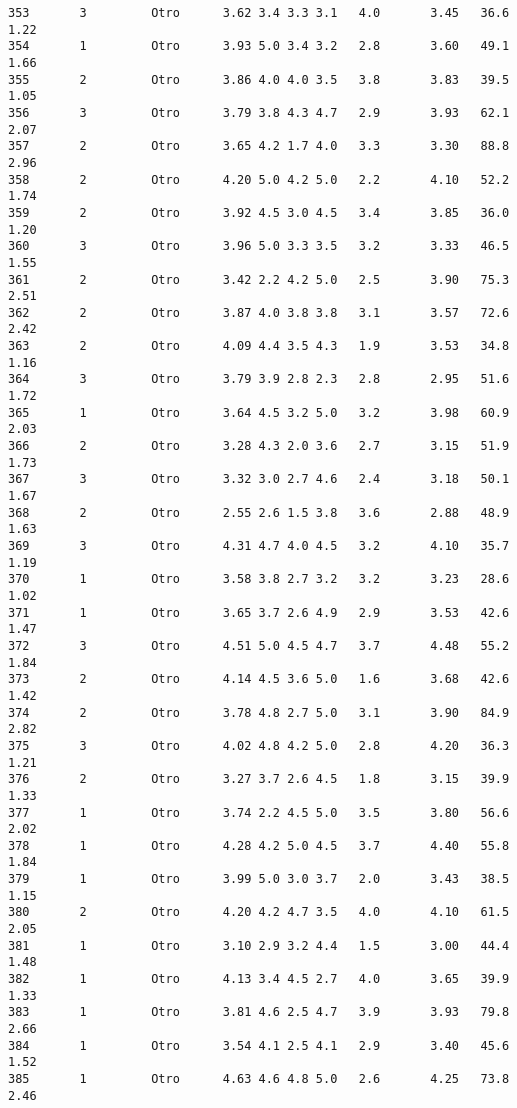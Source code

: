 \documentclass[
  letterpaper,
  DIV=11,
  numbers=noendperiod]{scrartcl}
\begin{document}
\begin{verbatim}
353       3         Otro      3.62 3.4 3.3 3.1   4.0       3.45   36.6    1.22
354       1         Otro      3.93 5.0 3.4 3.2   2.8       3.60   49.1    1.66
355       2         Otro      3.86 4.0 4.0 3.5   3.8       3.83   39.5    1.05
356       3         Otro      3.79 3.8 4.3 4.7   2.9       3.93   62.1    2.07
357       2         Otro      3.65 4.2 1.7 4.0   3.3       3.30   88.8    2.96
358       2         Otro      4.20 5.0 4.2 5.0   2.2       4.10   52.2    1.74
359       2         Otro      3.92 4.5 3.0 4.5   3.4       3.85   36.0    1.20
360       3         Otro      3.96 5.0 3.3 3.5   3.2       3.33   46.5    1.55
361       2         Otro      3.42 2.2 4.2 5.0   2.5       3.90   75.3    2.51
362       2         Otro      3.87 4.0 3.8 3.8   3.1       3.57   72.6    2.42
363       2         Otro      4.09 4.4 3.5 4.3   1.9       3.53   34.8    1.16
364       3         Otro      3.79 3.9 2.8 2.3   2.8       2.95   51.6    1.72
365       1         Otro      3.64 4.5 3.2 5.0   3.2       3.98   60.9    2.03
366       2         Otro      3.28 4.3 2.0 3.6   2.7       3.15   51.9    1.73
367       3         Otro      3.32 3.0 2.7 4.6   2.4       3.18   50.1    1.67
368       2         Otro      2.55 2.6 1.5 3.8   3.6       2.88   48.9    1.63
369       3         Otro      4.31 4.7 4.0 4.5   3.2       4.10   35.7    1.19
370       1         Otro      3.58 3.8 2.7 3.2   3.2       3.23   28.6    1.02
371       1         Otro      3.65 3.7 2.6 4.9   2.9       3.53   42.6    1.47
372       3         Otro      4.51 5.0 4.5 4.7   3.7       4.48   55.2    1.84
373       2         Otro      4.14 4.5 3.6 5.0   1.6       3.68   42.6    1.42
374       2         Otro      3.78 4.8 2.7 5.0   3.1       3.90   84.9    2.82
375       3         Otro      4.02 4.8 4.2 5.0   2.8       4.20   36.3    1.21
376       2         Otro      3.27 3.7 2.6 4.5   1.8       3.15   39.9    1.33
377       1         Otro      3.74 2.2 4.5 5.0   3.5       3.80   56.6    2.02
378       1         Otro      4.28 4.2 5.0 4.5   3.7       4.40   55.8    1.84
379       1         Otro      3.99 5.0 3.0 3.7   2.0       3.43   38.5    1.15
380       2         Otro      4.20 4.2 4.7 3.5   4.0       4.10   61.5    2.05
381       1         Otro      3.10 2.9 3.2 4.4   1.5       3.00   44.4    1.48
382       1         Otro      4.13 3.4 4.5 2.7   4.0       3.65   39.9    1.33
383       1         Otro      3.81 4.6 2.5 4.7   3.9       3.93   79.8    2.66
384       1         Otro      3.54 4.1 2.5 4.1   2.9       3.40   45.6    1.52
385       1         Otro      4.63 4.6 4.8 5.0   2.6       4.25   73.8    2.46

\end{verbatim}
\end{document}

